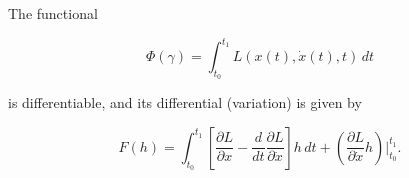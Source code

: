 The functional

$$\Phi(\gamma) = \int_{t_0}^{t_1} L(x(t), \dot{x}(t), t)\, dt$$

is differentiable, and its differential (variation) is given by

$$F(h) = \int_{t_0}^{t_1} \left[ \frac{\partial L}{\partial x} - \frac{d}{dt} \frac{\partial L}{\partial \dot{x}} \right] h\, dt + \left( \frac{\partial L}{\partial \dot{x}} h \right) \Bigg|_{t_0}^{t_1}.$$
